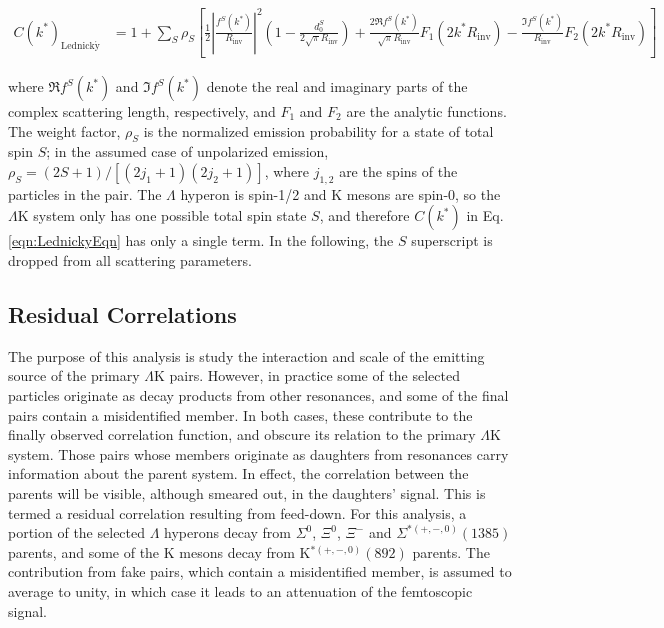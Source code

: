 \documentclass[ALICE,manyauthors]{cernphprep}
\newcommand{\Lam}{$\Lambda$\xspace}
\newcommand{\LamK}{$\Lambda$K\xspace}
\begin{document}
\begin{equation}
\begin{aligned}
C(k^{*})_{\mathrm{Lednick\acute{y}}} &= 1 + \sum_{S}\rho_{S}\left[\frac{1}{2}\left|\frac{f^{S}(k^{*})}{R_{\mathrm{inv}}}\right|^2\left(1-\frac{d^{S}_{0}}{2\sqrt{\pi}R_{\mathrm{inv}}}\right)+\frac{2\Re f^{S}(k^{*})}{\sqrt{\pi}R_{\mathrm{inv}}}F_{1}(2k^{*}R_{\mathrm{inv}})-\frac{\Im f^{S}(k^{*})}{R_{\mathrm{inv}}}F_{2}(2k^{*}R_{\mathrm{inv}})\right]
\end{aligned}  
\label{eqn:LednickyEqn}
\end{equation}

where $\Re f^{S}(k^{*})$ and $\Im f^{S}(k^{*})$ denote the real and imaginary parts of the complex scattering length, respectively, and $F_{1}$ and $F_{2}$ are the analytic functions.
The weight factor, $\rho_{S}$ is the normalized emission probability for a state of total spin $S$; in the assumed case of unpolarized emission, $\rho_{S} = (2S+1)/[(2j_{1}+1)(2j_{2}+1)]$, where $j_{1,2}$ are the spins of the particles in the pair.
The \Lam hyperon is spin-1/2 and K mesons are spin-0, so the \LamK system only has one possible total spin state $S$, and therefore $C(k^{*})$ in Eq. \ref{eqn:LednickyEqn} has only a single term.
In the following, the $S$ superscript is dropped from all scattering parameters.

\subsection{Residual Correlations}
\label{ResidualCorrelations}

The purpose of this analysis is study the interaction and scale of the emitting source of the primary \LamK pairs.
However, in practice some of the selected particles originate as decay products from other resonances, and some of the final pairs contain a misidentified member.
In both cases, these contribute to the finally observed correlation function, and obscure its relation to the primary \LamK system.
Those pairs whose members originate as daughters from resonances carry information about the parent system.
In effect, the correlation between the parents will be visible, although smeared out, in the daughters' signal.
This is termed a residual correlation resulting from feed-down.  
For this analysis, a portion of the selected \Lam hyperons decay from $\Sigma^{0}$, $\Xi^{0}$, $\Xi^{-}$ and $\Sigma^{*(+,-,0)}(1385)$ parents, and some of the K mesons decay from K$^{*(+,-,0)}(892)$ parents.
The contribution from fake pairs, which contain a misidentified member, is assumed to average to unity, in which case it leads to an attenuation of the femtoscopic signal.
\end{document}
